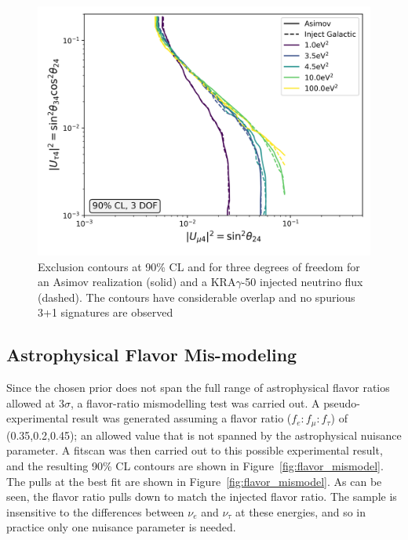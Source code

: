 \documentclass[main.tex]{subfiles}
\begin{document}
\begin{figure}
    \centering
    \includegraphics[width=0.7\linewidth]{figures/double_galactic_mismodel_fix_Realization_galactic_focus_sterile_0_cl0.9_dof3.png}
    \caption{Exclusion contours at 90\% CL and for three degrees of freedom for an Asimov realization (solid) and a KRA$\gamma$-50 injected neutrino flux (dashed). The contours have considerable overlap and no spurious 3+1 signatures are observed}\label{fig:galaxy}
\end{figure}

\subsection{Astrophysical Flavor Mis-modeling}

Since the chosen prior does not span the full range of astrophysical flavor ratios allowed at $3\sigma$, a flavor-ratio mismodelling test was carried out.
A pseudo-experimental result was generated assuming a flavor ratio ($f_{e}:f_{\mu}:f_{\tau}$) of (0.35,0.2,0.45); an allowed value that is not spanned by the astrophysical nuisance parameter. 
A fitscan was then carried out to this possible experimental result, and the resulting 90\% CL contours are shown in Figure~\ref{fig:flavor_mismodel}. The pulls at the best fit are shown in Figure~\ref{fig:flavor_mismodel}.
As can be seen, the flavor ratio pulls down to match the injected flavor ratio.
The sample is insensitive to the differences between $\nu_{e}$ and $\nu_{\tau}$ at these energies, and so in practice only one nuisance parameter is needed.
\end{document}
